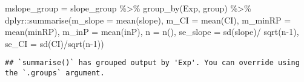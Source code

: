 \documentclass[
]{article}
\newenvironment{Shaded}{\begin{snugshade}}{\end{snugshade}}
\newcommand{\AttributeTok}[1]{\textcolor[rgb]{0.77,0.63,0.00}{#1}}
\newcommand{\ConstantTok}[1]{\textcolor[rgb]{0.00,0.00,0.00}{#1}}
\newcommand{\DecValTok}[1]{\textcolor[rgb]{0.00,0.00,0.81}{#1}}
\newcommand{\FunctionTok}[1]{\textcolor[rgb]{0.00,0.00,0.00}{#1}}
\newcommand{\NormalTok}[1]{#1}
\newcommand{\OtherTok}[1]{\textcolor[rgb]{0.56,0.35,0.01}{#1}}
\newcommand{\SpecialCharTok}[1]{\textcolor[rgb]{0.00,0.00,0.00}{#1}}
\newcommand{\StringTok}[1]{\textcolor[rgb]{0.31,0.60,0.02}{#1}}
\begin{document}
\begin{Shaded}
\begin{Highlighting}[]
\NormalTok{mslope\_group }\OtherTok{=}\NormalTok{ slope\_group }\SpecialCharTok{\%\textgreater{}\%}
    \FunctionTok{group\_by}\NormalTok{(Exp, group) }\SpecialCharTok{\%\textgreater{}\%} 
\NormalTok{    dplyr}\SpecialCharTok{::}\FunctionTok{summarise}\NormalTok{(}\AttributeTok{m\_slope =} \FunctionTok{mean}\NormalTok{(slope),}
                     \AttributeTok{m\_CI =} \FunctionTok{mean}\NormalTok{(CI),}
                     \AttributeTok{m\_minRP =} \FunctionTok{mean}\NormalTok{(minRP),}
                     \AttributeTok{m\_inP =} \FunctionTok{mean}\NormalTok{(inP),}
                     \AttributeTok{n =} \FunctionTok{n}\NormalTok{(), }
                     \AttributeTok{se\_slope =} \FunctionTok{sd}\NormalTok{(slope)}\SpecialCharTok{/} \FunctionTok{sqrt}\NormalTok{(n}\DecValTok{{-}1}\NormalTok{),}
                     \AttributeTok{se\_CI =} \FunctionTok{sd}\NormalTok{(CI)}\SpecialCharTok{/}\FunctionTok{sqrt}\NormalTok{(n}\DecValTok{{-}1}\NormalTok{))}
\end{Highlighting}
\end{Shaded}

\begin{verbatim}
## `summarise()` has grouped output by 'Exp'. You can override using the `.groups` argument.
\end{verbatim}

\begin{Shaded}
\end{Shaded}
\end{document}
